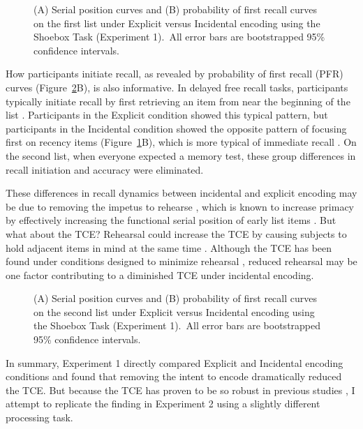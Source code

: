 \documentclass[man,natbib,floatsintext]{apa6} %
\begin{document}
\newcommand\spcpaneltext{~All error bars are bootstrapped 95\% confidence intervals.}
\begin{figure}
\caption{(A) Serial position curves and (B) probability of first recall curves on the first list under Explicit versus Incidental encoding using the Shoebox Task (Experiment 1).\spcpaneltext}
\label{e1_l1_spc}
\end{figure}

How participants initiate recall, as revealed by probability of first recall (PFR) curves (Figure~\ref{e1_l2_spc}B), is also informative. In delayed free recall tasks, participants typically initiate recall by first retrieving an item from near the beginning of the list \citep[i.e., they focus first on primacy items;][]{HowaKaha99}. Participants in the Explicit condition showed this typical pattern, but participants in the Incidental condition showed the opposite pattern of focusing first on recency items (Figure~\ref{e1_l1_spc}B), which is more typical of immediate recall \citep{Hoga75}. On the second list, when everyone expected a memory test, these group differences in recall initiation and accuracy were eliminated.

These differences in recall dynamics between incidental and explicit encoding may be due to removing the impetus to rehearse \citep{MarsWerd72,Neat93,GlenEtal80}, which is known to increase primacy by effectively increasing the  functional serial position of early list items \citep{Rund71,BrodMurd77,TanWard00}. But what about the TCE? Rehearsal could increase the TCE by causing subjects to hold adjacent items in mind at the same time \citep{Hint16}. Although the TCE has been found under conditions designed to minimize rehearsal \citep{HowaKaha99}, reduced rehearsal may be one factor contributing to a diminished TCE under incidental encoding.

\begin{figure}
\caption{(A) Serial position curves and (B) probability of first recall curves on the second list under Explicit versus Incidental encoding using the Shoebox Task (Experiment 1).\spcpaneltext}
\label{e1_l2_spc}
\end{figure}

In summary, Experiment 1 directly compared Explicit and Incidental encoding conditions and found that removing the intent to encode dramatically reduced the TCE. \color{black} But because the TCE has proven to be so robust in previous studies \citep{HealKaha17}, I attempt to replicate the finding in Experiment 2 using a slightly different processing task.
\end{document}
